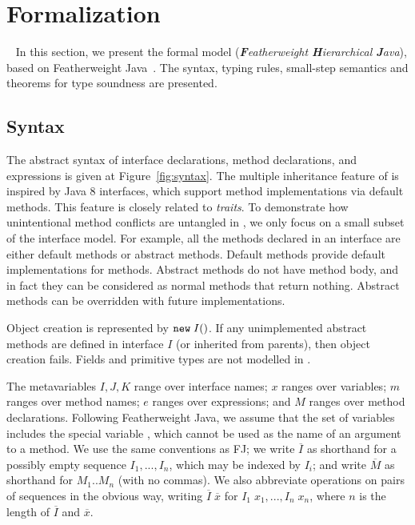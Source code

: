 \section{Formalization}~\label{sec:formalization}
In this section, we present the formal model \MIM{} (\emph{\textbf{F}eatherweight \textbf{H}ierarchical \textbf{J}ava}), based on
Featherweight Java~\cite{Igarashi01FJ}. The syntax, typing rules,
small-step semantics and theorems for type soundness are presented.

\vspace{-2ex}
\subsection{Syntax}
The abstract syntax of \MIM{} interface declarations, method declarations, and expressions is given at Figure~\ref{fig:syntax}. The multiple
inheritance feature of \MIM{} is inspired by Java 8 interfaces, which support
method implementations via default methods. This feature is 
closely related to \emph{traits}. To demonstrate how
unintentional method conflicts are untangled in \MIM{}, we only focus on a small subset of the interface model. For example, all the methods declared
in an interface are either default methods or abstract methods. Default methods provide default implementations for methods. Abstract methods do not
have method body, and in fact they can be considered as normal methods that return nothing. Abstract methods can be overridden with future implementations.

Object creation is represented by $\texttt{new} \; I()$. If any unimplemented abstract methods are defined in interface $I$ (or inherited from parents), then object creation fails. Fields and primitive types are not modelled in \MIM{}.

The metavariables $I, J, K$ range over interface names; $x$ ranges over variables; $m$ ranges over method names; $e$ ranges over expressions; and $M$ ranges over method declarations. Following Featherweight Java, we assume that the set of variables includes the special variable \kwthis, which cannot be used as the name of an argument to a method. We use the same
conventions as FJ; we write $\overline{I}$ as shorthand for a possibly empty sequence $I_1, ..., I_n$, which may be indexed by $I_i$; and write $\overline{M}$ as shorthand for $M_1 .. M_n$ (with no commas). We also abbreviate operations on pairs of sequences in the obvious way, writing $\overline{I} \; \overline{x}$ for $I_1 \; x_1, ..., I_n \; x_n$, where $n$ is the length of $\overline{I}$ and $\overline{x}$.

